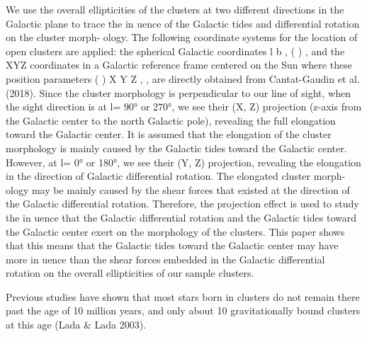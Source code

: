 \documentclass[../main.tex]{subfiles}
\begin{document}
{We use the overall ellipticities of the clusters at two different
directions in the Galactic plane to trace the in uence of the
Galactic tides and differential rotation on the cluster morph-
ology. The following coordinate systems for the location of
open clusters are applied: the spherical Galactic coordinates
l b , ( )
, and the XYZ coordinates in a Galactic reference frame
centered on the Sun where these position parameters ( )
X Y Z , ,
are directly obtained from Cantat-Gaudin et al. (2018). Since
the cluster morphology is perpendicular to our line of sight,
when the sight direction is at l= 90° or 270°, we see their (X,
Z) projection (z-axis from the Galactic center to the north
Galactic pole), revealing the full elongation toward the Galactic
center. It is assumed that the elongation of the cluster
morphology is mainly caused by the Galactic tides toward
the Galactic center. However, at l= 0° or 180°, we see their (Y,
Z) projection, revealing the elongation in the direction of
Galactic differential rotation. The elongated cluster morph-
ology may be mainly caused by the shear forces that existed at
the direction of the Galactic differential rotation. Therefore, the
projection effect is used to study the in uence that the Galactic
differential rotation and the Galactic tides toward the Galactic
center exert on the morphology of the clusters.
This paper shows that this means that the Galactic tides
toward the Galactic center may have more in uence than the
shear forces embedded in the Galactic differential rotation on the
overall ellipticities of our sample clusters.

Previous studies have shown that most stars
born in clusters do not remain there past the age of 10 million
years, and only about 10%
gravitationally bound clusters at this age (Lada & Lada 2003).


}
\end{document}
